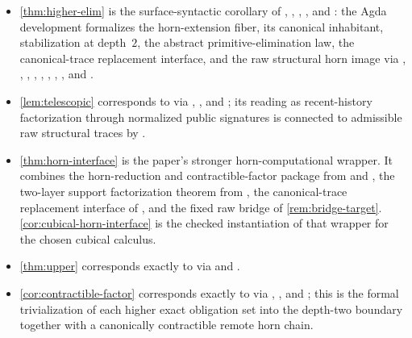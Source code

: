 \documentclass{lmcs}
\begin{document}
{\begin{itemize}[nosep]
\item \autoref{thm:higher-elim} is the surface-syntactic corollary of , , , , and : the Agda development formalizes the horn-extension fiber, its canonical inhabitant, stabilization at depth~$2$, the abstract primitive-elimination law, the canonical-trace replacement interface, and the raw structural horn image via , , , , , , , , and .
\item \autoref{lem:telescopic} corresponds to  via , , and ; its reading as recent-history factorization through normalized public signatures is connected to admissible raw structural traces by .
\item \autoref{thm:horn-interface} is the paper's stronger horn-computational wrapper. It combines the horn-reduction and contractible-factor package from  and , the two-layer support factorization theorem  from , the canonical-trace replacement interface of , and the fixed raw bridge of \autoref{rem:bridge-target}. \autoref{cor:cubical-horn-interface} is the checked instantiation of that wrapper for the chosen cubical calculus.
\item \autoref{thm:upper} corresponds exactly to  via  and .
\item \autoref{cor:contractible-factor} corresponds exactly to  via , , and ; this is the formal trivialization of each higher exact obligation set into the depth-two boundary together with a canonically contractible remote horn chain.

\end{itemize}}
\end{document}
